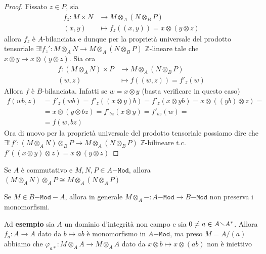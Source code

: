 \begin{proof}{}
    Fissato \(z \in P\), sia 
    \begin{align*}
        f_z: M \times N &\longrightarrow M \otimes_A {(N \otimes_B P)} \\
        {(x,y)} &\longmapsto f_z({(x,y)}) = x \otimes {(y \otimes z)}
    \end{align*}
    allora \(f_z\) è \(A\)-bilanciata e dunque per la proprietà universale del prodotto
    tensoriale \(\exists ! f_z' : M \otimes_A N \to M \otimes_A {(N \otimes_B
    P)}\) \(\mathbb{Z}\)-lineare tale che \(x \otimes y \mapsto x \otimes {(y
    \otimes z)}\). Sia ora 
    \begin{align*}
        f: {(M \otimes_A N)} \times P &\longrightarrow M \otimes_A {(N \otimes_B
        P)} \\
        {(w,z)} &\longmapsto f({(w,z)}) = f'_z{(w)}
    \end{align*}
    Allora \(f\) è \(B\)-bilanciata. Infatti se \(w = x \otimes y\) (basta
    verificare in questo caso) 
    \begin{align*}
        f{(wb, z)}&= f'_z{(wb)} = f'_z {({(x \otimes y)}b)} = f'_z {(x \otimes yb)}
        = x \otimes {({(yb)} \otimes z)} = \\ &= x \otimes {(y \otimes bz)} = f'_{bz}
      {(x \otimes y)} = f'_{bz} {(w)} = \\ &= f{(w, bz)}
    \end{align*}
    Ora di nuovo per la proprietà universale del prodotto tensoriale possiamo
    dire che
    \(
      \exists ! \, f': {(M \otimes_A N)} \otimes_B P \to M \otimes_A {(N
      \otimes_B P)} \) \(\mathbb{Z}\)-bilineare t.c. \(f'{({(x \otimes y)}
      \otimes z)} = x \otimes {(y \otimes z)}
    \)
\end{proof}
\begin{corollary}{}
    Se \(A\) è commutativo e \(M, N, P \in A\mathtt{-Mod}\), allora \({(M
    \otimes_A N)} \otimes_A P \cong M \otimes_A {(N \otimes_A P)}\) 
\end{corollary}

\begin{remark}{}
    Se \(M \in B\mathtt{-Mod-}A\), allora in generale \(M \otimes_A - :
    A\mathtt{-Mod} \to B\mathtt{-Mod}\) non preserva i monomorfismi.

    Ad \textbf{esempio} sia \(A\) un dominio d'integrità non campo e sia \(0
    \neq a \in A \sminus A^{*}\). Allora \(f_a: A \to A\) dato da \(b \mapsto
    ab\) è monomorfismo in \(A\mathtt{-Mod}\), ma preso \(M = A/(a)\) abbiamo
    che \(\varphi _{a*} : M \otimes_A A\to M \otimes_A A\) dato da \(x \otimes b
    \mapsto x \otimes {(ab)}\) non è iniettivo %
\end{remark}

